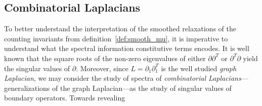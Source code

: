 \documentclass[12pt]{article}
\numberwithin{equation}{section}
\newcommand{\+}{%
	\raisebox{0.18ex}{\scaleobj{0.55}{+}}
}
\theoremstyle{definition}
\begin{document}
%

\subsection{Combinatorial Laplacians}\label{sec:laplacian_theory}
To better understand the interpretation of the smoothed relaxations of the counting invariants from definition~\ref{def:smooth_mu}, it is imperative to understand what the spectral information  constitutive terms encodes. 
It is well known that the square roots of the non-zero eigenvalues of either $\partial \partial^T$ or $\partial^T \partial$ yield the singular values of $\partial$. 
Moreover, since $L = \partial_1 \partial_1^T$ is the well studied \emph{graph Laplacian}, we may consider the study of spectra of \emph{combinatorial Laplacians}---generalizations of the graph Laplacian---as the study of singular values of boundary operators. Towards revealing  
\end{document}
